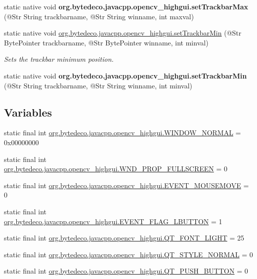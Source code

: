 \begin{DoxyCompactItemize}
static native void {\bfseries org.\+bytedeco.\+javacpp.\+opencv\+\_\+highgui.\+set\+Trackbar\+Max} (@Str String trackbarname, @Str String winname, int maxval)
\item 
static native void \hyperlink{group__highgui_gaf177a5a7400badc50be0ce11d404c74f}{org.\+bytedeco.\+javacpp.\+opencv\+\_\+highgui.\+set\+Trackbar\+Min} (@Str Byte\+Pointer trackbarname, @Str Byte\+Pointer winname, int minval)
\begin{DoxyCompactList}\small\item\em Sets the trackbar minimum position. \end{DoxyCompactList}\item 
\mbox{\label{group__highgui_ga0493c87b0a728ca9972039017a6ab3e9}} 
static native void {\bfseries org.\+bytedeco.\+javacpp.\+opencv\+\_\+highgui.\+set\+Trackbar\+Min} (@Str String trackbarname, @Str String winname, int minval)
\end{DoxyCompactItemize}
\subsection*{Variables}
\begin{DoxyCompactItemize}
\item 
static final int \hyperlink{group__highgui_ga2afebfdebe6ea3696f89b4a7628e72e3}{org.\+bytedeco.\+javacpp.\+opencv\+\_\+highgui.\+W\+I\+N\+D\+O\+W\+\_\+\+N\+O\+R\+M\+AL} = 0x00000000
\item 
static final int \hyperlink{group__highgui_ga600b654f3be9263c511b1588f7ea735d}{org.\+bytedeco.\+javacpp.\+opencv\+\_\+highgui.\+W\+N\+D\+\_\+\+P\+R\+O\+P\+\_\+\+F\+U\+L\+L\+S\+C\+R\+E\+EN} = 0
\item 
static final int \hyperlink{group__highgui_ga6d55d280d31ae69d883e955f615fda29}{org.\+bytedeco.\+javacpp.\+opencv\+\_\+highgui.\+E\+V\+E\+N\+T\+\_\+\+M\+O\+U\+S\+E\+M\+O\+VE} = 0
\item 
static final int \hyperlink{group__highgui_gac433101d8b17471ae4cc5161be63c257}{org.\+bytedeco.\+javacpp.\+opencv\+\_\+highgui.\+E\+V\+E\+N\+T\+\_\+\+F\+L\+A\+G\+\_\+\+L\+B\+U\+T\+T\+ON} = 1
\item 
static final int \hyperlink{group__highgui_gae35aa28b68ea30b61b8b4b740ceca6e3}{org.\+bytedeco.\+javacpp.\+opencv\+\_\+highgui.\+Q\+T\+\_\+\+F\+O\+N\+T\+\_\+\+L\+I\+G\+HT} = 25
\item 
static final int \hyperlink{group__highgui_ga7818f5f33d8fac97fbdba68143ec8bb7}{org.\+bytedeco.\+javacpp.\+opencv\+\_\+highgui.\+Q\+T\+\_\+\+S\+T\+Y\+L\+E\+\_\+\+N\+O\+R\+M\+AL} = 0
\item 
static final int \hyperlink{group__highgui_gaae4d93a303a93e9c2ecece3adad55dc4}{org.\+bytedeco.\+javacpp.\+opencv\+\_\+highgui.\+Q\+T\+\_\+\+P\+U\+S\+H\+\_\+\+B\+U\+T\+T\+ON} = 0
\end{DoxyCompactItemize}


